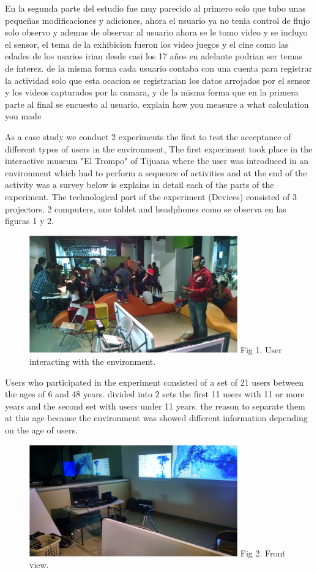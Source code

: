\documentclass[journal]{IEEEtran}
\begin{document}
En la segunda parte del estudio fue muy parecido al primero solo que tubo unas pequeñas modificaciones y adiciones, ahora el usuario ya no tenia control de flujo solo observo y ademas de observar al usuario ahora se le tomo video y se incluyo el sensor, el tema de la exhibicion fueron los video juegos y el cine como las edades de los usarios irian desde casi los 17 años en adelante podrian ser temas de interez. de la misma forma cada usuario contaba con una cuenta para registrar la actividad solo que esta ocacion se registrarian los datos arrojados por el sensor y los videos capturados por la camara, y de la misma forma que en la primera parte al final se encuesto al usuario.       
explain how you measure a what calculation you made

As a case study we conduct 2 experiments the first to test the acceptance of different types of users in the environment, The first experiment took place in the interactive museum "El Trompo" of Tijuana where the user was introduced in an environment which had to perform a sequence of activities and at the end of the activity was a survey below is explains in detail each of the parts of the experiment.
The technological part of the experiment (Devices) consisted of 3 projectors, 2 computers, one tablet and headphones como se observa en las figuras 1 y 2.
\begin{figure}[ht]
	\centering
	\includegraphics [width=90mm] {tromp.PNG}
	\label{fig:Figure 1}
	Fig 1. User interacting with the environment.
\end{figure}
Users who participated in the experiment consisted of a set of 21 users between the ages of 6 and 48 years. divided into 2 sets the first 11 users with 11 or more years and the second set with users under 11 years. the reason to separate them at this age because the environment was showed different information depending on the age of users.
\begin{figure}[ht]
	\centering
	\includegraphics [width=90mm]{tromp2.PNG}
	\label{fig:Figure 2}
	Fig 2. Front view.
\end{figure}
\end{document}
